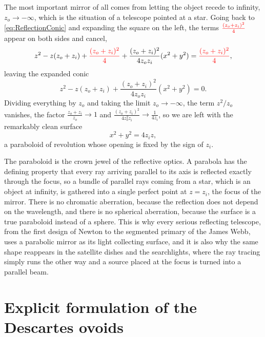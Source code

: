                 The most important mirror of all comes from letting the object recede to infinity, $z_o\to-\infty$, which is the situation of a telescope pointed at a star. Going back to \ref{eq:ReflectionConic} and expanding the square on the left, the terms ${\color{red}\frac{(z_o+z_i)^2}{4}}$ appear on both sides and cancel,
                \begin{equation*}
                    z^2 - z(z_o+z_i) + {\color{red}\frac{(z_o+z_i)^2}{4}} + \frac{(z_o+z_i)^2}{4z_oz_i}(x^2+y^2) = {\color{red}\frac{(z_o+z_i)^2}{4}},
                \end{equation*}
                leaving the expanded conic
                \begin{equation*}
                    z^2 - z(z_o+z_i) + \frac{(z_o+z_i)^2}{4z_oz_i}(x^2+y^2) = 0.
                \end{equation*}
                Dividing everything by $z_o$ and taking the limit $z_o\to-\infty$, the term $z^2/z_o$ vanishes, the factor $\frac{z_o+z_i}{z_o}\to 1$ and $\frac{(z_o+z_i)^2}{4z_o^2z_i}\to\frac{1}{4z_i}$, so we are left with the remarkably clean surface
                \begin{equation}\label{eq:ParabolicMirror}
                    x^2+y^2 = 4z_iz,
                \end{equation}
                a paraboloid of revolution whose opening is fixed by the sign of $z_i$.

                The paraboloid is the crown jewel of the reflective optics. A parabola has the defining property that every ray arriving parallel to its axis is reflected exactly through the focus, so a bundle of parallel rays coming from a star, which is an object at infinity, is gathered into a single perfect point at $z=z_i$, the focus of the mirror. There is no chromatic aberration, because the reflection does not depend on the wavelength, and there is no spherical aberration, because the surface is a true paraboloid instead of a sphere. This is why every serious reflecting telescope, from the first design of Newton to the segmented primary of the James Webb, uses a parabolic mirror as its light collecting surface, and it is also why the same shape reappears in the satellite dishes and the searchlights, where the ray tracing simply runs the other way and a source placed at the focus is turned into a parallel beam.

                
                

        \section{Explicit formulation of the Descartes ovoids}

